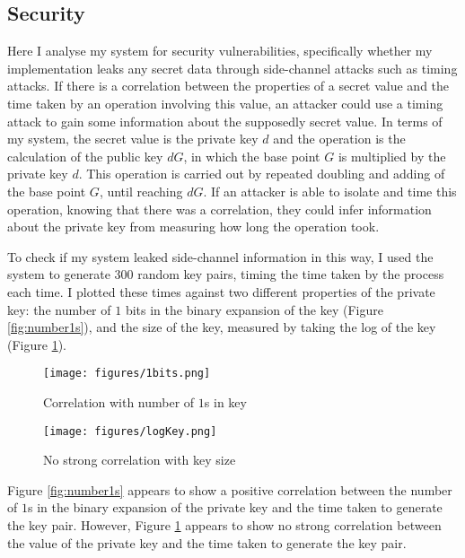 \documentclass[12pt,a4paper]{article}
\begin{document}
\subsection{Security} \noindent \label{Security}
Here I analyse my system for security vulnerabilities, 
specifically whether my implementation leaks any secret data through side-channel attacks such as timing attacks. 
If there is a correlation between the properties of a secret value and the time taken by an operation involving this value, 
an attacker could use a timing attack to gain some information about the supposedly secret value. 
In terms of my system, the secret value is the private key $d$ and the operation is the calculation of the public key $dG$, 
in which the base point $G$ is multiplied by the private key $d$. 
This operation is carried out by repeated doubling and adding of the base point $G$, until reaching $dG$. 
If an attacker is able to isolate and time this operation, knowing that there was a correlation, 
they could infer information about the private key from measuring how long the operation took. 

To check if my system leaked side-channel information in this way, 
I used the system to generate 300 random key pairs, timing the time taken by the process each time. 
I plotted these times against two different properties of the private key: 
the number of $1$ bits in the binary expansion of the key (Figure \ref{fig:number1s}), 
and the size of the key, measured by taking the log of the key (Figure \ref{fig:logkey}). 

\begin{figure}[!htb]
    \begin{minipage}{0.5\textwidth}
        \centering
        \texttt{[image: figures/1bits.png]}
        \caption{Correlation with number of $1$s in key}
        \label{fig:number1s}
    \end{minipage}\hfill
    \begin{minipage}{0.5\textwidth}
        \centering
        \texttt{[image: figures/logKey.png]}
        \caption{No strong correlation with key size}
        \label{fig:logkey}
    \end{minipage}
\end{figure}

Figure \ref{fig:number1s} appears to show a positive correlation between the number of $1$s in the binary expansion of the private key and the time taken to generate the key pair. 
However, Figure \ref{fig:logkey} appears to show no strong correlation between the value of the private key and the time taken to generate the key pair. 
\end{document}
